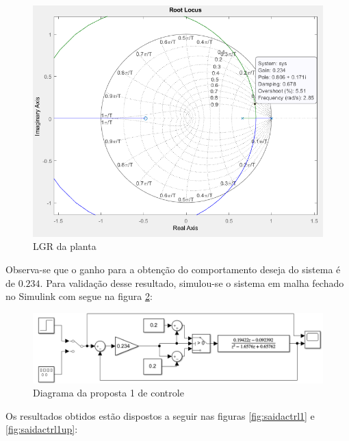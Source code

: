 \documentclass[a4paper,11pt]{article}
\begin{document}
\begin{figure}[H]
    \centering
    \includegraphics[width=\linewidth]{src/tex/img/rlocus.PNG}
    \caption{LGR da planta}
    \label{fig:lgr}
\end{figure}

Observa-se que o ganho para a obtenção do comportamento deseja do sistema é de $0.234$. Para validação desse resultado, simulou-se o sistema em malha fechado no Simulink com segue na figura \ref{fig:controle1}:

\begin{figure}[H]
    \centering
    \includegraphics[width=\linewidth]{src/tex/img/controle_1.PNG}
    \caption{Diagrama da proposta 1 de controle}
    \label{fig:controle1}
\end{figure}

Os resultados obtidos estão dispostos a seguir nas figuras \ref{fig:saidactrl1} e \ref{fig:saidactrl1up}: 
\end{document}
